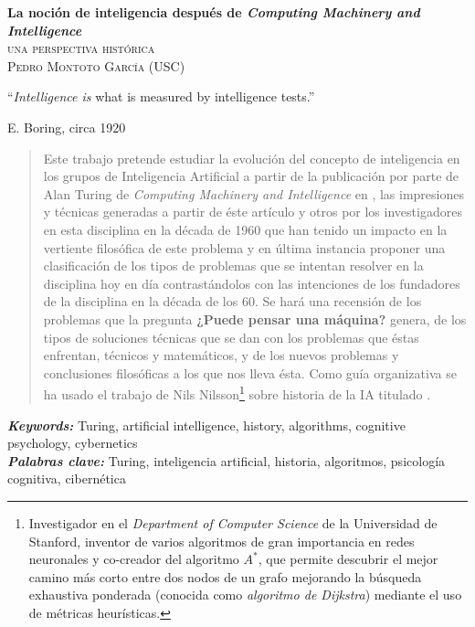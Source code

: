 \documentclass[12pt]{memoir}
\makeatletter
\newlength\drop
\newcommand*\titleM{\begingroup%
\setlength\drop{0.08\textheight}
\centering
\vspace*{\drop}
{\Huge\bfseries La noción de inteligencia después de \textit{Computing Machinery and Intelligence}}\\[\baselineskip]
{\scshape una perspectiva histórica}\\[\baselineskip]
\vfill
{\large\scshape Pedro Montoto García (USC)}\par
\vfill
{\scshape \@date}\par
\vspace*{2\drop}
\endgroup}
\providecommand{\keywords}[2]{
	\textbf{\textit{Keywords: }} #1 \\
	\textbf{\textit{Palabras clave: }} #2
}
\makeatother
\begin{document}
\pagestyle{empty}




\begin{titlingpage}
\titleM
\end{titlingpage}



\setlength{\epigraphwidth}{0.8\textwidth}
\thispagestyle{empty}
\epigraph{``\textit{Intelligence is} what is measured by intelligence tests.''}{E. Boring, circa 1920}
\newpage


\thispagestyle{empty}
\begin{abstract}
	Este trabajo pretende estudiar la evolución del concepto de inteligencia en los grupos de Inteligencia Artificial a partir de la publicación por parte de Alan Turing de \textit{Computing Machinery and Intelligence} en \cite{Turing1950cmi}, las impresiones y técnicas generadas a partir de éste artículo y otros por los investigadores en esta disciplina en la década de 1960 que han tenido un impacto en la vertiente filosófica de este problema y en última instancia proponer una clasificación de los tipos de problemas que se intentan resolver en la disciplina hoy en día contrastándolos con las intenciones de los fundadores de la disciplina en la década de los 60. Se hará una recensión de los problemas que la pregunta \textbf{¿Puede pensar una máquina?} genera, de los tipos de soluciones técnicas que se dan con los problemas que éstas enfrentan, técnicos y matemáticos, y de los nuevos problemas y conclusiones filosóficas a los que nos lleva ésta. Como guía organizativa se ha usado el trabajo de Nils Nilsson\footnote{Investigador en el \textit{Department of Computer Science} de la Universidad de Stanford, inventor de varios algoritmos de gran importancia en redes neuronales y co-creador del algoritmo $A^*$, que permite descubrir el mejor camino más corto entre dos nodos de un grafo mejorando la búsqueda exhaustiva ponderada (conocida como \textit{algoritmo de Dijkstra}) mediante el uso de métricas heurísticas.} \parencite{Nilsson2009} sobre historia de la IA titulado .
\end{abstract}
\keywords{Turing, artificial intelligence, history, algorithms, cognitive psychology, cybernetics}{Turing, inteligencia artificial, historia, algoritmos, psicología cognitiva, cibernética}
\end{document}

